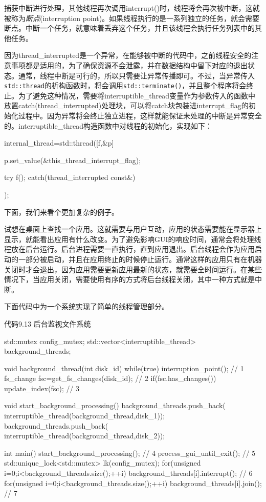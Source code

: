 捕获中断进行处理，其他线程再次调用interrupt()时，线程将会再次被中断，这就被称为\textit{断点}(interruption point)。如果线程执行的是一系列独立的任务，就会需要断点。中断一个任务，就意味着丢弃这个任务，并且该线程会执行任务列表中的其他任务。

因为thread\_interrupted是一个异常，在能够被中断的代码中，之前线程安全的注意事项都是适用的，为了确保资源不会泄露，并在数据结构中留下对应的退出状态。通常，线程中断是可行的，所以只需要让异常传播即可。不过，当异常传入\texttt{std::thread}的析构函数时，将会调用\texttt{std::terminate()}，并且整个程序将会终止。为了避免这种情况，需要将interruptible\_thread变量作为参数传入的函数中放置catch(thread\_interrupted)处理块，可以将catch块包装进interrupt\_flag的初始化过程中。因为异常将会终止独立进程，这样就能保证未处理的中断是异常安全的。interruptible\_thread构造函数中对线程的初始化，实现如下：

\begin{cpp}
internal_thread=std::thread([f,&p]{
        p.set_value(&this_thread_interrupt_flag);

        try
        {
          f();
        }
        catch(thread_interrupted const&)
        {}
      });
\end{cpp}

下面，我们来看个更加复杂的例子。


试想在桌面上查找一个应用。这就需要与用户互动，应用的状态需要能在显示器上显示，就能看出应用有什么改变。为了避免影响GUI的响应时间，通常会将处理线程放在后台运行。后台进程需要一直执行，直到应用退出。后台线程会作为应用启动的一部分被启动，并且在应用终止的时候停止运行。通常这样的应用只有在机器关闭时才会退出，因为应用需要更新应用最新的状态，就需要全时间运行。在某些情况下，当应用关闭，需要使用有序的方式将后台线程关闭，其中一种方式就是中断。

下面代码中为一个系统实现了简单的线程管理部分。

代码9.13 后台监视文件系统

\begin{cpp}
std::mutex config_mutex;
std::vector<interruptible_thread> background_threads;

void background_thread(int disk_id)
{
  while(true)
  {
    interruption_point();  // 1
    fs_change fsc=get_fs_changes(disk_id);  // 2
    if(fsc.has_changes())
    {
      update_index(fsc);  // 3
    }
  }
}

void start_background_processing()
{
  background_threads.push_back(
    interruptible_thread(background_thread,disk_1));
  background_threads.push_back(
    interruptible_thread(background_thread,disk_2));
}

int main()
{
  start_background_processing();  // 4
  process_gui_until_exit();  // 5
  std::unique_lock<std::mutex> lk(config_mutex);
  for(unsigned i=0;i<background_threads.size();++i)
  {
    background_threads[i].interrupt();  // 6
  }
  for(unsigned i=0;i<background_threads.size();++i)
  {
    background_threads[i].join(); // 7
  }
}
\end{cpp}

